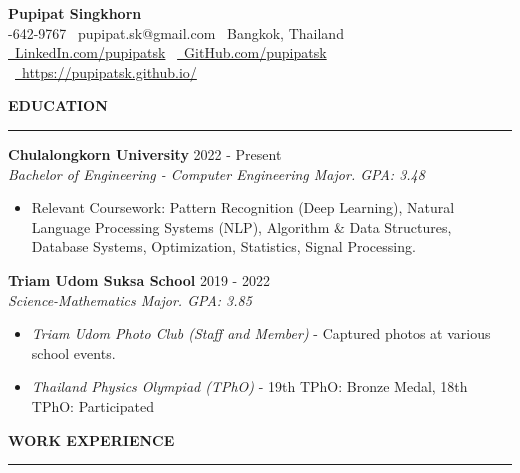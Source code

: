 \documentclass[a4paper, 11pt]{article}
\begin{document}
\begin{center}
    {\Large \textbf{Pupipat Singkhorn}} \\
    -642-9767 \textbullet\ pupipat.sk@gmail.com \textbullet\ Bangkok, Thailand
    \\
    \href{www.linkedin.com/in/pupipatsk}{\faLinkedin\ LinkedIn.com/pupipatsk}
    \textbullet\ \href{https://github.com/pupipatsk}{\faGithub\ GitHub.com/pupipatsk}
    \textbullet\ \href{https://pupipatsk.github.io/}{\faGlobe\ https://pupipatsk.github.io/}
\end{center}

\textbf{EDUCATION}
\vspace{5pt}
{\color{NavyBlue}\hrule}
\vspace{6pt}

\textbf{Chulalongkorn University} \hfill 2022 - Present\\
\textit{Bachelor of Engineering - Computer Engineering Major. GPA: 3.48}
\begin{itemize}[noitemsep, topsep=0pt, partopsep=0pt, parsep=0pt]
    \item Relevant Coursework: Pattern Recognition (Deep Learning), Natural Language Processing Systems (NLP), Algorithm \& Data Structures, Database Systems, Optimization, Statistics, Signal Processing.
\end{itemize}

\vspace{2pt}

\textbf{Triam Udom Suksa School} \hfill 2019 - 2022\\
\textit{Science-Mathematics Major. GPA: 3.85}
\begin{itemize}[noitemsep, topsep=0pt, partopsep=0pt, parsep=0pt]
    \item \textit{Triam Udom Photo Club (Staff and Member)} - Captured photos at various school events.
    \item \textit{Thailand Physics Olympiad (TPhO)} - 19th TPhO: Bronze Medal, 18th TPhO: Participated
\end{itemize}

\vspace{6pt}
\textbf{WORK EXPERIENCE}
\vspace{5pt}
{\color{NavyBlue}\hrule}
\vspace{6pt}
\end{document}
